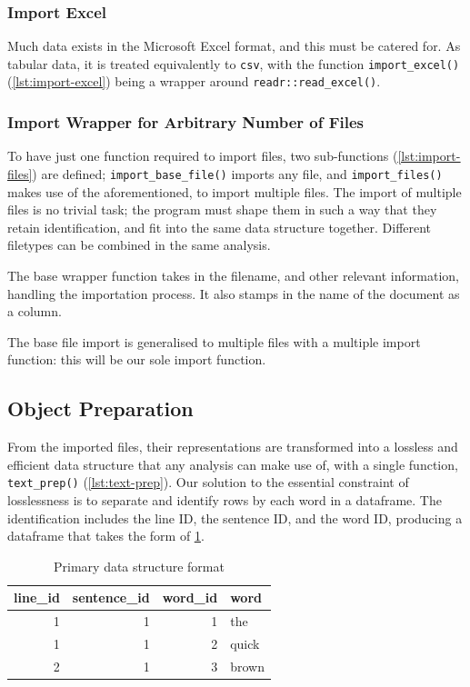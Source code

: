 \documentclass[11pt, a4paper, titlepage]{report}
\begin{document}
\subsubsection{Import Excel}

Much data exists in the Microsoft Excel format, and this must be
catered for. As tabular data, it is treated equivalently to
\texttt{csv}, with the function \texttt{import_excel()}
(\underline{\cref{lst:import-excel}}) being a wrapper
around \texttt{readr::read_excel()}.

\subsubsection{Import Wrapper for Arbitrary Number of Files}

To have just one function required to import files, two sub-functions
(\underline{\cref{lst:import-files}}) are defined;
\texttt{import_base_file()} imports any file, and
\texttt{import_files()} makes use of the aforementioned, to
import multiple files. The import of multiple files is no trivial
task; the program must shape them in such a way that they retain
identification, and fit into the same data structure together.
Different filetypes can be combined in the same analysis.

The base wrapper function takes in the filename, and other relevant
information, handling the importation process. It also stamps in the
name of the document as a column.

The base file import is generalised to multiple files with a multiple
import function: this will be our sole import function.

\subsection{Object Preparation}

From the imported files, their representations are transformed into a
lossless and efficient data structure that any analysis can make use
of, with a single function, \texttt{text_prep()}
(\underline{\cref{lst:text-prep}}). Our solution to the essential
constraint of losslessness is to separate and identify rows by each
word in a dataframe. The identification includes the line ID, the
sentence ID, and the word ID, producing a dataframe that takes the
form of \underline{\cref{tab:data-base}}.

\begin{table}[h]
  \centering
  
  \begin{tabular}{rrrl}
    line\_id & sentence\_id & word\_id & word\\
    \toprule
    1 & 1 & 1 & the\\
    1 & 1 & 2 & quick\\
    2 & 1 & 3 & brown\\
  \end{tabular}  
  \caption{Primary data structure format}\label{tab:data-base}
\end{table}
\end{document}
